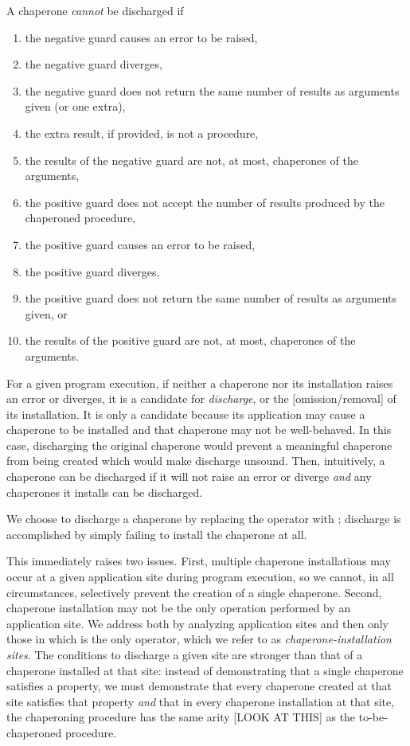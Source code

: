 A chaperone \emph{cannot} be discharged if
\begin{enumerate}
\item the negative guard causes an error to be raised,
\item the negative guard diverges,
\item the negative guard does not return the same number of results as arguments given (or one extra),
\item the extra result, if provided, is not a procedure,
\item the results of the negative guard are not, at most, chaperones of the arguments,
\item the positive guard does not accept the number of results produced by the chaperoned procedure,
\item the positive guard causes an error to be raised,
\item the positive guard diverges,
\item the positive guard does not return the same number of results as arguments given, or
\item the results of the positive guard are not, at most, chaperones of the arguments.
\end{enumerate}

For a given program execution, if neither a chaperone nor its installation raises an error or diverges, it is a candidate for \emph{discharge}, or the [omission/removal] of its installation.
It is only a candidate because its application may cause a chaperone to be installed and that chaperone may not be well-behaved.
In this case, discharging the original chaperone would prevent a meaningful chaperone from being created which would make discharge unsound.
Then, intuitively, a chaperone can be discharged if it will not raise an error or diverge  \emph{and} any chaperones it installs can be discharged.

We choose to discharge a chaperone by replacing the  operator with ; discharge is accomplished by simply failing to install the chaperone at all.

This immediately raises two issues.
First, multiple chaperone installations may occur at a given application site during program execution, so we cannot, in all circumstances, selectively prevent the creation of a single chaperone.
Second, chaperone installation may not be the only operation performed by an application site.
We address both by analyzing application sites and then only those in which  is the only operator, which we refer to as \emph{chaperone-installation sites}.
The conditions to discharge a given site are stronger than that of a chaperone installed at that site: instead of demonstrating that a single chaperone satisfies a property, we must demonstrate that every chaperone created at that site satisfies that property \emph{and} that in every chaperone installation at that site, the chaperoning procedure has the same arity [LOOK AT THIS] as the to-be-chaperoned procedure.

